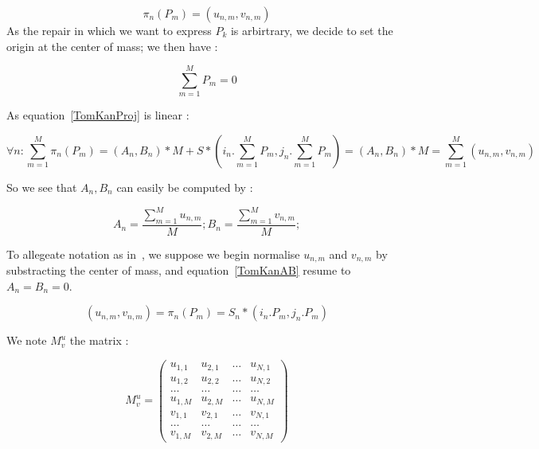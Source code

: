\begin{equation}
    \pi_n(P_m) = (u_{n,m},v_{n,m})
\end{equation}
As the repair in which we want to express $P_k$ is arbirtrary, we decide to  set the 
origin at the center of mass; we then have   :


\begin{equation}
   \sum_{m=1}^{M} P_m = 0 \label{TomKanCDM}
\end{equation}

As equation~\ref{TomKanProj} is linear : 


\begin{equation}
     \forall n : \sum_{m=1}^{M} \pi_n(P_m)  
     =  (A_n,B_n) * M + S *(i_n. \sum_{m=1}^{M} P_m,j_n. \sum_{m=1}^{M} P_m)
     = (A_n,B_n) * M
     = \sum_{m=1}^{M} (u_{n,m},v_{n,m})
\end{equation}

So we see that $A_n,B_n$ can easily be computed by  :


\begin{equation}
   A_n = \frac{\sum_{m=1}^{M}u_{n,m}}{M} ;
   B_n = \frac{\sum_{m=1}^{M}v_{n,m}}{M} ; \label{TomKanAB}
\end{equation}

To allegeate notation as in~\cite{TomKan}, we suppose we begin normalise $u_{n,m}$ and $v_{n,m}$ 
by substracting the center of mass, and equation~\ref{TomKanAB} resume to $A_n=B_n=0$.


\begin{equation}
   (u_{n,m},v_{n,m}) =  \pi_n(P_m) =   S_n * (i_n . P_m, j_n.P_m) \label{TomKanProj2}
\end{equation}


We note $M^u_v$ the matrix :


\begin{equation}
M^u_v=
\left( \begin{array}{cccc} 
             u_{1,1} & u_{2,1}  & \dots & u_{N,1} \\ 
             u_{1,2} & u_{2,2}  & \dots & u_{N,2} \\
              \dots &  \dots  & \dots &   \dots   \\
             u_{1,M} & u_{2,M}  & \dots & u_{N,M} \\
             v_{1,1} & v_{2,1}  & \dots & v_{N,1} \\ 
              \dots &  \dots  & \dots &   \dots   \\
             v_{1,M} & v_{2,M}  & \dots & v_{N,M} 
        \end{array} 
\right)
\end{equation}


